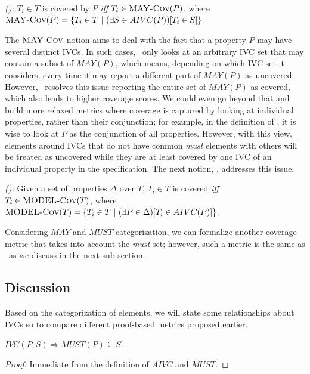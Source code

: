 \begin{definition} {\emph{(\maycov):}}
  \label{def:comp-1}
 $T_i \in T$ is covered by $P$ \emph{iff} $T_i \in \text{\sc MAY-Cov} (P)$, where
   $\text{\sc MAY-Cov} (P) =  \{T_i \in T ~|~ (\exists S \in AIVC(P))[T_i \in S] \}$.
\end{definition}

The $\text{\sc MAY-Cov}$ notion aims to deal with the fact that a property $P$ may have
several distinct IVCs. In such cases, \ivccov\ only looks at an arbitrary IVC set
that may contain a subset of $MAY(P)$, which means, depending on
which IVC set it considers, every time it may report a different part of $MAY(P)$
as uncovered. However, \maycov\ resolves this issue reporting the entire set of $MAY(P)$ as covered, which also leads to higher coverage scores.
We could even go beyond that and build more relaxed metrics where coverage
is captured by looking at individual properties, rather than their conjunction;
for example, in the definition of \ivccov , it is wise to look at $P$ as
the conjunction of all properties. However, with this view,
elements around IVCs that do not have common \emph{must}
elements with others will be treated as uncovered while they are at least covered by one
 IVC of an individual property in the specification. The next notion, \allcov ,
 addresses this issue.

\begin{definition} {\emph{(\allcov):}}
  \label{def:comp-2}
     Given a set of properties $\Delta$ over $T$, $T_i \in T$ is covered
   \emph{iff} $T_i \in \text{\sc MODEL-Cov} (T)$, where
   $\text{\sc MODEL-Cov} (T) = \{T_i \in T ~|~ (\exists P \in \Delta)[T_i \in AIVC(P)] \}$.
\end{definition}

Considering $MAY$ and $MUST$ categorization, we can formalize another
coverage metric that takes into account the \emph{must} set;
however, such a metric is the same as \nondetcov\ as we discuss in the next sub-section.

\subsection{Discussion}
\label{subsec:method-disc}


Based on the categorization of elements, we will state some relationships about IVCs so to compare different proof-based metrics proposed earlier.

\begin{lemma}
  \label{lem:ivc-must-may}
 $IVC(P, S) \Rightarrow  MUST(P) \subseteq S$.
\end{lemma}
\begin{proof}
 Immediate from the definition of $AIVC$ and $MUST$.
\end{proof}
\vspace{2mm}

